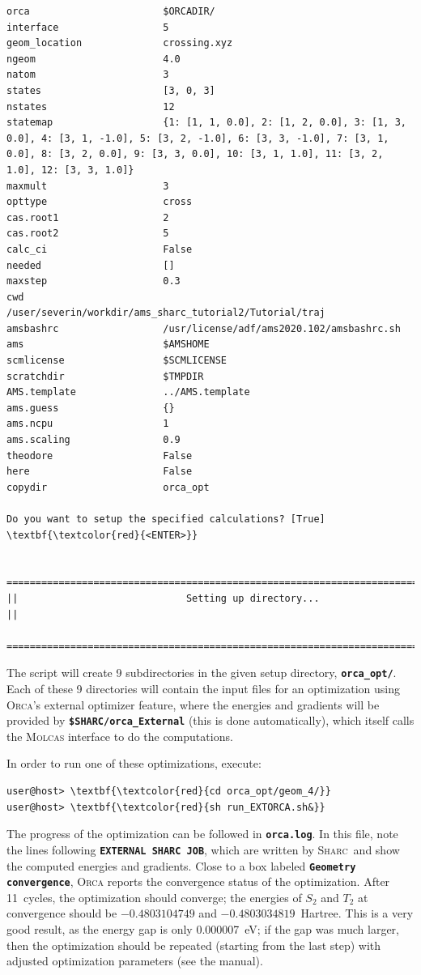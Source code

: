 \documentclass[a4paper,11pt,DIV=15,openany]{scrbook}
\newcommand{\sharc}{\textsc{Sharc}}
\newcommand{\ttt}[1]{\textbf{\texttt{#1}}}
\begin{document}
\begin{oframed}
\begin{Verbatim}[commandchars=\\\{\}]
orca                       $ORCADIR/
interface                  5
geom_location              crossing.xyz
ngeom                      4.0
natom                      3
states                     [3, 0, 3]
nstates                    12
statemap                   {1: [1, 1, 0.0], 2: [1, 2, 0.0], 3: [1, 3, 0.0], 4: [3, 1, -1.0], 5: [3, 2, -1.0], 6: [3, 3, -1.0], 7: [3, 1, 0.0], 8: [3, 2, 0.0], 9: [3, 3, 0.0], 10: [3, 1, 1.0], 11: [3, 2, 1.0], 12: [3, 3, 1.0]}
maxmult                    3
opttype                    cross
cas.root1                  2
cas.root2                  5
calc_ci                    False
needed                     []
maxstep                    0.3
cwd                        /user/severin/workdir/ams_sharc_tutorial2/Tutorial/traj
amsbashrc                  /usr/license/adf/ams2020.102/amsbashrc.sh
ams                        $AMSHOME
scmlicense                 $SCMLICENSE
scratchdir                 $TMPDIR
AMS.template               ../AMS.template
ams.guess                  {}
ams.ncpu                   1
ams.scaling                0.9
theodore                   False
here                       False
copydir                    orca_opt

Do you want to setup the specified calculations? [True] \textbf{\textcolor{red}{<ENTER>}}

  ================================================================================
||                             Setting up directory...                            ||
  ================================================================================
\end{Verbatim}
\end{oframed}

\normalsize
The script will create 9 subdirectories in the given setup directory, \ttt{orca\_opt/}.
Each of these 9 directories will contain the input files for an optimization using \textsc{Orca}'s external optimizer feature, where the energies and gradients will be provided by \ttt{\$SHARC/orca\_External} (this is done automatically), which itself calls the \textsc{Molcas} interface to do the computations.

In order to run one of these optimizations, execute:
\begin{Verbatim}[commandchars=\\\{\}]
user@host> \textbf{\textcolor{red}{cd orca_opt/geom_4/}}
user@host> \textbf{\textcolor{red}{sh run_EXTORCA.sh&}}
\end{Verbatim}
The progress of the optimization can be followed in \ttt{orca.log}. In this file, note the lines following \ttt{EXTERNAL SHARC JOB}, which are written by \sharc\ and show the computed energies and gradients.
Close to a box labeled \ttt{Geometry convergence}, \textsc{Orca} reports the convergence status of the optimization.
After 11~cycles, the optimization should converge; the energies of $S_2$ and $T_2$ at convergence should be $-0.4803104749$ and $-0.4803034819$~Hartree.
This is a very good result, as the energy gap is only 0.000007~eV; if the gap was much larger, then the optimization should be repeated (starting from the last step) with adjusted optimization parameters (see the manual).
\end{document}
